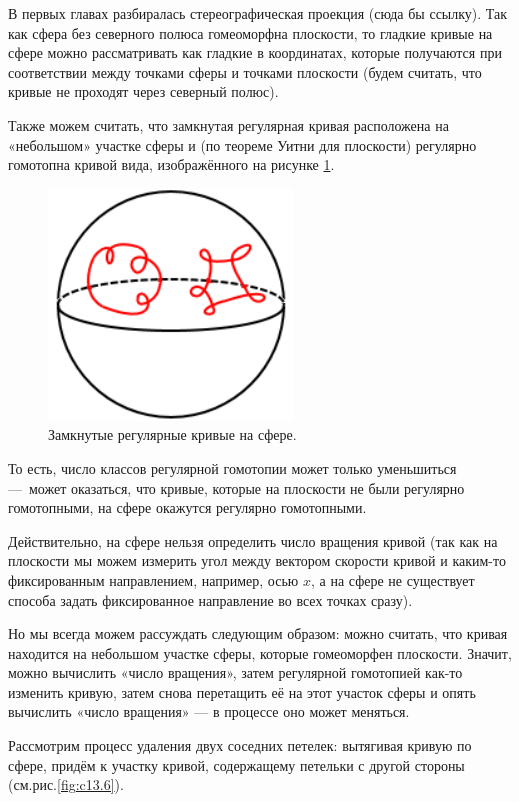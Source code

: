 В первых главах разбиралась стереографическая проекция (сюда бы ссылку). Так как сфера без северного полюса гомеоморфна плоскости, то гладкие кривые на сфере можно рассматривать как гладкие в координатах, которые получаются при соответствии между точками сферы и точками плоскости (будем считать, что кривые не проходят через северный полюс).

Также можем считать, что замкнутая регулярная кривая расположена на «небольшом» участке сферы и (по теореме Уитни для плоскости) регулярно гомотопна кривой вида, изображённого на рисунке \ref{fig:c13.5}.

\begin{figure}[ht]
    \centering
    \includegraphics[scale=0.7]{images/c13.5.png}
    \caption{Замкнутые регулярные кривые на сфере.}
    \label{fig:c13.5}
\end{figure}

То есть, число классов регулярной гомотопии может только уменьшиться — может оказаться, что кривые, которые на плоскости не были регулярно гомотопными, на сфере окажутся регулярно гомотопными.

Действительно, на сфере нельзя определить число вращения кривой (так как на плоскости мы можем измерить угол между вектором скорости кривой и каким-то фиксированным направлением, например, осью $x$, а на сфере не существует способа задать фиксированное направление во всех точках сразу).

Но мы всегда можем рассуждать следующим образом: можно считать, что кривая находится на небольшом участке сферы, которые гомеоморфен плоскости. Значит, можно вычислить «число вращения», затем регулярной гомотопией как-то изменить кривую, затем снова перетащить её на этот участок сферы и опять вычислить «число вращения» — в процессе оно может меняться.

Рассмотрим процесс удаления двух соседних петелек: вытягивая кривую по сфере, придём к участку кривой, содержащему петельки с другой стороны (см.рис.\ref{fig:c13.6}).

